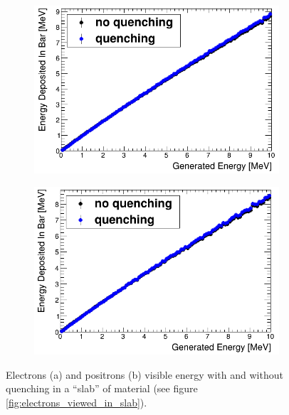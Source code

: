 \begin{figure}[!h]
\centering
\begin{subfigure}{.45\textwidth}
  \centering
  \includegraphics[width=\linewidth]{Chapter4/Figs/newQuenchPlots/e-BirksPolyQuenchingComparisonAdjusted.png}
  \captionsetup{width=.9\linewidth}
  \caption{}
  \label{subFig:electron_quenched_and_not}
\end{subfigure}%
\begin{subfigure}{.45\textwidth}
  \centering
  \includegraphics[width=\linewidth]{Chapter4/Figs/newQuenchPlots/e+BirksPolyQuenchingComparisonAdjusted.png}
  \captionsetup{width=.9\linewidth}
  \caption{}
  \label{subFig:positron_quenched_and_not}
\end{subfigure}
\caption{Electrons (a) and positrons (b) visible energy with and without quenching in a ``slab'' of material (see figure \ref{fig:electrons_viewed_in_slab}).}
\label{fig:electron_positron_quenched_and_not}
\end{figure}

